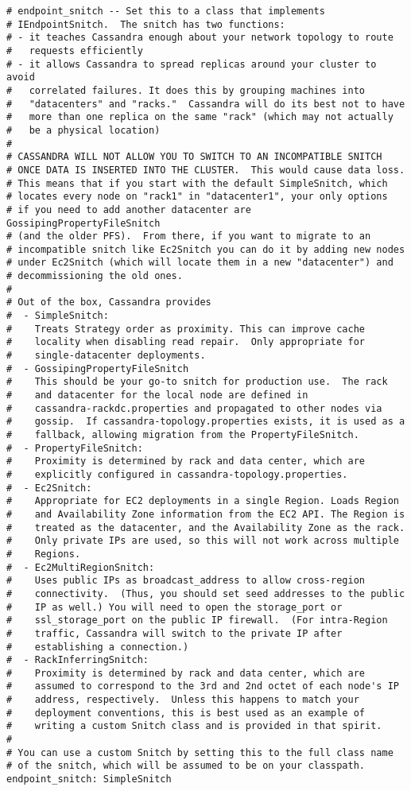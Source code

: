 \begin{verbatim}
# endpoint_snitch -- Set this to a class that implements
# IEndpointSnitch.  The snitch has two functions:
# - it teaches Cassandra enough about your network topology to route
#   requests efficiently
# - it allows Cassandra to spread replicas around your cluster to avoid
#   correlated failures. It does this by grouping machines into
#   "datacenters" and "racks."  Cassandra will do its best not to have
#   more than one replica on the same "rack" (which may not actually
#   be a physical location)
#
# CASSANDRA WILL NOT ALLOW YOU TO SWITCH TO AN INCOMPATIBLE SNITCH
# ONCE DATA IS INSERTED INTO THE CLUSTER.  This would cause data loss.
# This means that if you start with the default SimpleSnitch, which
# locates every node on "rack1" in "datacenter1", your only options
# if you need to add another datacenter are GossipingPropertyFileSnitch
# (and the older PFS).  From there, if you want to migrate to an
# incompatible snitch like Ec2Snitch you can do it by adding new nodes
# under Ec2Snitch (which will locate them in a new "datacenter") and
# decommissioning the old ones.
#
# Out of the box, Cassandra provides
#  - SimpleSnitch:
#    Treats Strategy order as proximity. This can improve cache
#    locality when disabling read repair.  Only appropriate for
#    single-datacenter deployments.
#  - GossipingPropertyFileSnitch
#    This should be your go-to snitch for production use.  The rack
#    and datacenter for the local node are defined in
#    cassandra-rackdc.properties and propagated to other nodes via
#    gossip.  If cassandra-topology.properties exists, it is used as a
#    fallback, allowing migration from the PropertyFileSnitch.
#  - PropertyFileSnitch:
#    Proximity is determined by rack and data center, which are
#    explicitly configured in cassandra-topology.properties.
#  - Ec2Snitch:
#    Appropriate for EC2 deployments in a single Region. Loads Region
#    and Availability Zone information from the EC2 API. The Region is
#    treated as the datacenter, and the Availability Zone as the rack.
#    Only private IPs are used, so this will not work across multiple
#    Regions.
#  - Ec2MultiRegionSnitch:
#    Uses public IPs as broadcast_address to allow cross-region
#    connectivity.  (Thus, you should set seed addresses to the public
#    IP as well.) You will need to open the storage_port or
#    ssl_storage_port on the public IP firewall.  (For intra-Region
#    traffic, Cassandra will switch to the private IP after
#    establishing a connection.)
#  - RackInferringSnitch:
#    Proximity is determined by rack and data center, which are
#    assumed to correspond to the 3rd and 2nd octet of each node's IP
#    address, respectively.  Unless this happens to match your
#    deployment conventions, this is best used as an example of
#    writing a custom Snitch class and is provided in that spirit.
#
# You can use a custom Snitch by setting this to the full class name
# of the snitch, which will be assumed to be on your classpath.
endpoint_snitch: SimpleSnitch


\end{verbatim}
